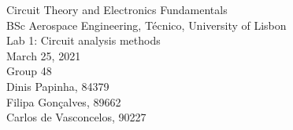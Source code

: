
\thispagestyle {empty}


\begin{center}
%
\vspace{1.0cm}

\vspace{1cm}
{\FontLb Circuit Theory and Electronics Fundamentals} \\ %
\vspace{1cm}
{\FontSn BSc Aerospace Engineering, Técnico, University of Lisbon} \\ %
\vspace{1cm}
{\FontSn Lab 1: Circuit analysis methods} \\
\vspace{1cm}
{\FontSn March 25, 2021} \\ %
\vspace{1cm}
{\FontSn Group 48} \\ %
{\FontSn Dinis Papinha, 84379} \\ %
{\FontSn Filipa Gonçalves, 89662} \\ %
{\FontSn Carlos de Vasconcelos, 90227} \\ %
%
\end{center}
